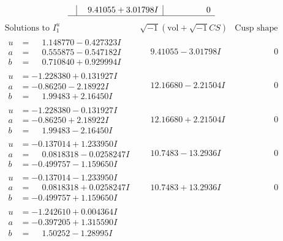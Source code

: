 \documentclass[1p]{elsarticle_modified}
\theoremstyle{definition}
\newcommand{\I}{\sqrt{-1}}
\begin{document}
$$\begin{array}{c|c|c}
 & \phantom{-}9.41055 + 3.01798 I & \phantom{-0.000000 } 0\\
 \hline 
 \end{array}$$\newpage$$\begin{array}{c|c|c}  
\text{Solutions to }I^u_{1}& \I (\text{vol} + \sqrt{-1}CS) & \text{Cusp shape}\\
 \hline 
\begin{aligned}
u &= \phantom{-}1.148770 - 0.427323 I \\
a &= \phantom{-}0.555875 - 0.547182 I \\
b &= \phantom{-}0.710840 + 0.929994 I\end{aligned}
 & \phantom{-}9.41055 - 3.01798 I & \phantom{-0.000000 } 0 \\ \hline\begin{aligned}
u &= -1.228380 + 0.131927 I \\
a &= -0.86250 - 2.18922 I \\
b &= \phantom{-}1.99483 + 2.16450 I\end{aligned}
 & \phantom{-}12.16680 - 2.21504 I & \phantom{-0.000000 } 0 \\ \hline\begin{aligned}
u &= -1.228380 - 0.131927 I \\
a &= -0.86250 + 2.18922 I \\
b &= \phantom{-}1.99483 - 2.16450 I\end{aligned}
 & \phantom{-}12.16680 + 2.21504 I & \phantom{-0.000000 } 0 \\ \hline\begin{aligned}
u &= -0.137014 + 1.233950 I \\
a &= \phantom{-}0.0818318 - 0.0258247 I \\
b &= -0.499757 - 1.159650 I\end{aligned}
 & \phantom{-}10.7483 - 13.2936 I & \phantom{-0.000000 } 0 \\ \hline\begin{aligned}
u &= -0.137014 - 1.233950 I \\
a &= \phantom{-}0.0818318 + 0.0258247 I \\
b &= -0.499757 + 1.159650 I\end{aligned}
 & \phantom{-}10.7483 + 13.2936 I & \phantom{-0.000000 } 0 \\ \hline\begin{aligned}
u &= -1.242610 + 0.004364 I \\
a &= -0.397205 + 1.315590 I \\
b &= \phantom{-}1.50252 - 1.28995 I\end{aligned}

\end{array}$$
\end{document}
